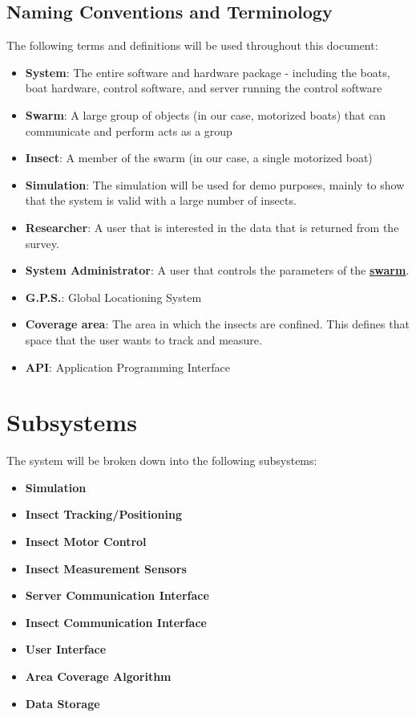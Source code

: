 \documentclass[11pt]{article}
\begin{document}
\subsection{Naming Conventions and Terminology}
\label{sec:definitions}
The following terms and definitions will be used throughout this document:
\begin{itemize}
\item \textbf{System}: The entire software and hardware package - including the boats,
boat hardware, control software, and server running the control software
\item \textbf{Swarm}: A large group of objects (in our case, motorized boats) that can communicate and perform acts as a group
\item \textbf{Insect}: A member of the swarm (in our case, a single motorized boat)
\item \textbf{Simulation}: The simulation will be used for demo purposes, mainly to show that
the system is valid with a large number of insects.
\item \textbf{Researcher}: A user that is interested in the data that is returned from the survey.
\item \textbf{System Administrator}: A user that controls the parameters of the \hyperref[sec:definitions]{\textbf{swarm}}.
\item \textbf{G.P.S.}: Global Locationing System
\item \textbf{Coverage area}: The area in which the insects are confined. This defines that space that the user wants to track and measure.
\item \textbf{API}: Application Programming Interface
\end{itemize}

\section{Subsystems}
The system will be broken down into the following subsystems:

\begin{itemize}
\item \textbf{Simulation}
\item \textbf{Insect Tracking/Positioning}
\item \textbf{Insect Motor Control}
\item \textbf{Insect Measurement Sensors}
\item \textbf{Server Communication Interface}
\item \textbf{Insect Communication Interface}
\item \textbf{User Interface}
\item \textbf{Area Coverage Algorithm}
\item \textbf{Data Storage}

\end{itemize}
\end{document}
